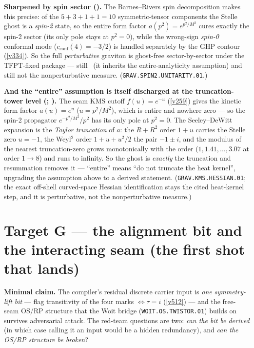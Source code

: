 \par\smallskip\noindent\textbf{Sharpened by spin sector (\mC).} The Barnes--Rivers spin decomposition makes
this precise: of the $5{+}3{+}1{+}1{=}10$ symmetric-tensor components the Stelle ghost is a \emph{spin-2} state,
so the entire form factor $a(p^2){=}e^{p^2/M^2}$ cures exactly the spin-2 sector (its only pole stays at
$p^2{=}0$), while the wrong-sign \emph{spin-0} conformal mode ($c_{\mathrm{conf}}(4){=}-3/2$) is handled
separately by the GHP contour (\vref{v334}). So the full \emph{perturbative} graviton is ghost-free
sector-by-sector under the TFPT-fixed package --- still \mC\ (it inherits the entire-analyticity assumption) and
still not the nonperturbative measure. (\texttt{GRAV.SPIN2.UNITARITY.01}.) 

\par\smallskip\noindent\textbf{And the ``entire'' assumption is itself discharged at the truncation-tower level
(\mE; ).} The seam KMS cutoff $f(u){=}e^{-u}$ (\vref{v259}) gives the kinetic
form factor $a(u){=}e^{u}$ ($u{=}p^2/M^2$), which is entire and nowhere zero --- so the spin-2 propagator
$e^{-p^2/M^2}/p^2$ has its only pole at $p^2{=}0$. The Seeley--DeWitt expansion is the \emph{Taylor truncation}
of $a$: the $R{+}R^2$ order $1{+}u$ carries the Stelle zero $u{=}-1$, the Weyl$^2$ order $1{+}u{+}u^2/2$ the
pair $-1{\pm}i$, and the modulus of the nearest truncation-zero grows monotonically with the order
($1,1.41,\dots,3.07$ at order $1\!\to\!8$) and runs to infinity. So the ghost is \emph{exactly} the truncation
and resummation removes it --- ``entire'' means ``do not truncate the heat kernel'', upgrading the assumption
above to a derived statement. (\texttt{GRAV.KMS.HESSIAN.01}; the exact off-shell curved-space Hessian
identification stays the cited heat-kernel step, and it is perturbative, not the nonperturbative measure.)

\section*{Target G --- the alignment bit and the interacting seam (the first shot that lands)}\label{sec:G}
\noindent\textbf{Minimal claim.} The compiler's residual discrete carrier input is \emph{one
symmetry-lift bit} --- flag transitivity of the four marks $\iff\tau=i$ (\vref{v512}) --- and the
free-seam OS/RP structure that the Woit bridge (\texttt{WOIT.OS.TWISTOR.01}) builds on survives
adversarial attack. The red-team questions are two: \emph{can the bit be derived} (in which case
calling it an input would be a hidden redundancy), and \emph{can the OS/RP structure be broken}?


